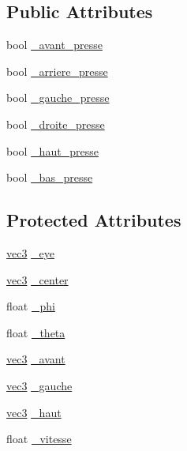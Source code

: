 \subsection*{Public Attributes}
\begin{DoxyCompactItemize}
\item 
bool \hyperlink{class_camera_a4cab15e35a96fdcb2a8599fea13a9b8f}{\+\_\+avant\+\_\+presse}
\item 
bool \hyperlink{class_camera_a0ce12f74953fcd53192e48f8b4164e2e}{\+\_\+arriere\+\_\+presse}
\item 
bool \hyperlink{class_camera_ac2a5c37c4f9603a14e3616d6a75f7998}{\+\_\+gauche\+\_\+presse}
\item 
bool \hyperlink{class_camera_a61b2e438537b99ba1f0a97e5586b7f45}{\+\_\+droite\+\_\+presse}
\item 
bool \hyperlink{class_camera_a43b59b53cb182906d56e6e4d2c31139c}{\+\_\+haut\+\_\+presse}
\item 
bool \hyperlink{class_camera_aaba6828f97c9ef07b6b135a665bd3008}{\+\_\+bas\+\_\+presse}
\end{DoxyCompactItemize}
\subsection*{Protected Attributes}
\begin{DoxyCompactItemize}
\item 
\hyperlink{structvec3}{vec3} \hyperlink{class_camera_ad4c22c27bd247f4411c4166220ba6e82}{\+\_\+eye}
\item 
\hyperlink{structvec3}{vec3} \hyperlink{class_camera_ad80a82cbc81e6d8ba04c7cc1ac7ba0d7}{\+\_\+center}
\item 
float \hyperlink{class_camera_a288df53a3ff446ee4367ee47b8499fcd}{\+\_\+phi}
\item 
float \hyperlink{class_camera_aeb3c859c3c254c8296420451259e5629}{\+\_\+theta}
\item 
\hyperlink{structvec3}{vec3} \hyperlink{class_camera_ab7cf8c1eae6b2f35a20e8abd1f0570c9}{\+\_\+avant}
\item 
\hyperlink{structvec3}{vec3} \hyperlink{class_camera_aaf97dba7663b99065d8d508b589224de}{\+\_\+gauche}
\item 
\hyperlink{structvec3}{vec3} \hyperlink{class_camera_af860db197a7abbf0284df4e32a95a347}{\+\_\+haut}
\item 
float \hyperlink{class_camera_a9062fdde515a49bf8db963ac46be9942}{\+\_\+vitesse}
\end{DoxyCompactItemize}
